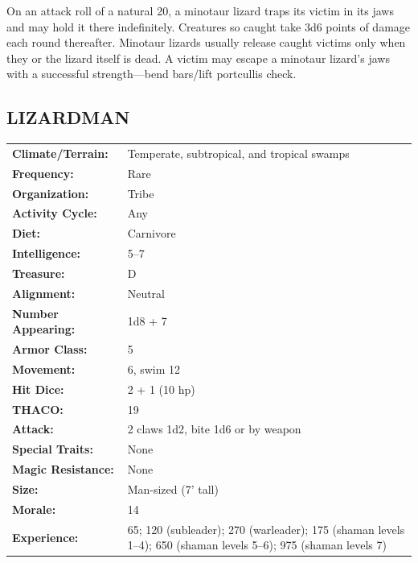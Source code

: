 \begin{multicols}{2}
On an attack roll of a natural 20, a minotaur lizard traps its victim in its jaws and may hold it there indefinitely. Creatures so caught take 3d6 points of damage each round thereafter. Minotaur lizards usually release caught victims only when they or the lizard itself is dead. A victim may escape a minotaur lizard's jaws with a successful strength---bend bars/lift portcullis check.



\noindent
\begin{minipage}{\columnwidth}

\vspace{1em}

\subsection{LIZARDMAN}

\noindent \begin{tabular}{p{}p{}}
\textbf{Climate/Terrain:}	& Temperate, subtropical, and tropical swamps	\\
\textbf{Frequency:} 		& Rare	\\
\textbf{Organization:} 		& Tribe	\\
\textbf{Activity Cycle:} 	& Any	\\
\textbf{Diet:} 				& Carnivore	\\
\textbf{Intelligence:} 		& 5--7	\\
\textbf{Treasure:} 			& D	\\
\textbf{Alignment:} 		& Neutral	\\
\hline
\textbf{Number Appearing:} 	& 1d8 + 7	\\
\textbf{Armor Class:} 		& 5	\\
\textbf{Movement:} 			& 6, swim 12	\\
\textbf{Hit Dice:} 			& 2 + 1 (10 hp)	\\
\textbf{THACO:} 			& 19	\\
\textbf{Attack:} 			& 2 claws 1d2, bite 1d6	or by weapon\\
\textbf{Special Traits:} & None	\\
\textbf{Magic Resistance:} 	& None	\\
\textbf{Size:} 				& Man-sized (7' tall)	\\
\textbf{Morale:} 			& 14	\\
\textbf{Experience:} 		& 65; 120 (subleader); 270 (warleader); 175 (shaman levels 1--4); 650 (shaman levels 5--6); 975 (shaman levels 7)	\\ %
\end{tabular}


\end{minipage}
\end{multicols}
